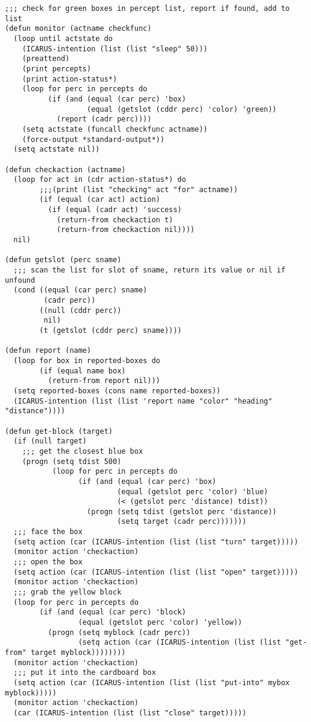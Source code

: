 \documentclass{article}
\begin{document}
\begin{verbatim}
;;; check for green boxes in percept list, report if found, add to list
(defun monitor (actname checkfunc)
  (loop until actstate do
    (ICARUS-intention (list (list "sleep" 50)))
    (preattend)
    (print percepts)
    (print action-status*)
    (loop for perc in percepts do
          (if (and (equal (car perc) 'box) 
                   (equal (getslot (cddr perc) 'color) 'green))
            (report (cadr perc))))
    (setq actstate (funcall checkfunc actname))
    (force-output *standard-output*))
  (setq actstate nil))

(defun checkaction (actname)
  (loop for act in (cdr action-status*) do
        ;;;(print (list "checking" act "for" actname))
        (if (equal (car act) action)
          (if (equal (cadr act) 'success)
            (return-from checkaction t)
            (return-from checkaction nil))))
  nil)

(defun getslot (perc sname)
  ;;; scan the list for slot of sname, return its value or nil if unfound
  (cond ((equal (car perc) sname)
         (cadr perc))
        ((null (cddr perc))
         nil)
        (t (getslot (cddr perc) sname))))

(defun report (name)
  (loop for box in reported-boxes do
        (if (equal name box)
          (return-from report nil)))
  (setq reported-boxes (cons name reported-boxes))
  (ICARUS-intention (list (list 'report name "color" "heading" "distance"))))

(defun get-block (target)
  (if (null target)
    ;;; get the closest blue box
    (progn (setq tdist 500)
           (loop for perc in percepts do
                 (if (and (equal (car perc) 'box)
                          (equal (getslot perc 'color) 'blue)
                          (< (getslot perc 'distance) tdist))
                   (progn (setq tdist (getslot perc 'distance))
                          (setq target (cadr perc)))))))
  ;;; face the box
  (setq action (car (ICARUS-intention (list (list "turn" target)))))
  (monitor action 'checkaction)
  ;;; open the box
  (setq action (car (ICARUS-intention (list (list "open" target)))))
  (monitor action 'checkaction)
  ;;; grab the yellow block
  (loop for perc in percepts do
        (if (and (equal (car perc) 'block)
                 (equal (getslot perc 'color) 'yellow))
          (progn (setq myblock (cadr perc))
                 (setq action (car (ICARUS-intention (list (list "get-from" target myblock))))))))
  (monitor action 'checkaction)
  ;;; put it into the cardboard box
  (setq action (car (ICARUS-intention (list (list "put-into" mybox myblock)))))
  (monitor action 'checkaction)
  (car (ICARUS-intention (list (list "close" target)))))
\end{verbatim}
\end{document}
